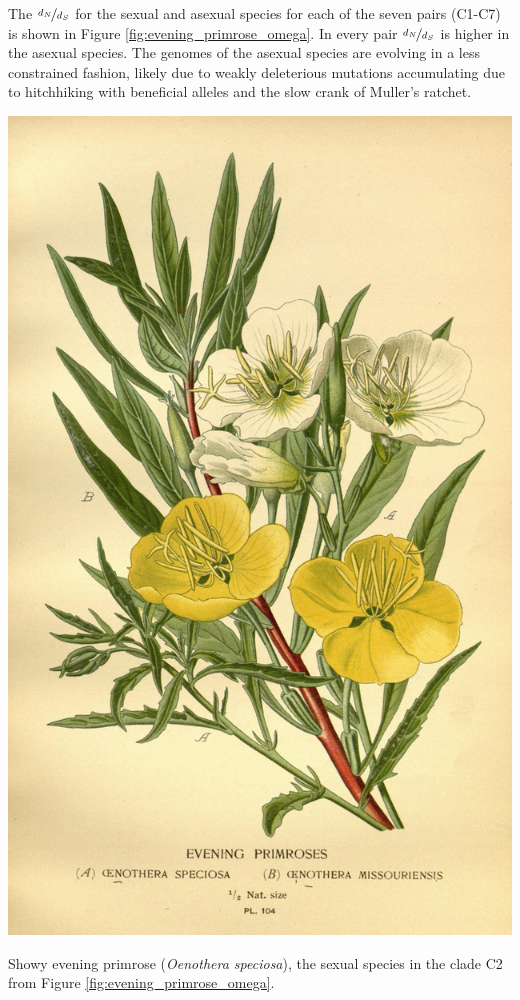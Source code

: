 The $\nicefrac{d_N}{d_S}$ for the sexual and asexual species for each of the seven pairs (C1-C7) is shown in Figure \ref{fig:evening_primrose_omega}. In every pair $\nicefrac{d_N}{d_S}$ is higher in the asexual species. The genomes of the asexual species are evolving in a less constrained fashion, likely due to weakly deleterious mutations accumulating due to hitchhiking with beneficial alleles and the slow crank of Muller's ratchet. 
\begin{marginfigure}[0cm]
\begin{center}
  \includegraphics[width = \textwidth]{illustration_images/multiple_sel_loci/Evening_primrose/10575005313_f2c8839a80_k.jpg}
\end{center}
\caption{ Showy evening primrose ({\it Oenothera speciosa}), the sexual species in the clade C2 from Figure \ref{fig:evening_primrose_omega}.  } \label{fig:Oenothera}  %
\end{marginfigure}

